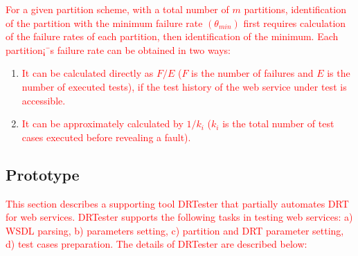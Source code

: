 \documentclass[10pt,journal,compsoc]{IEEEtran}
\begin{document}
\textcolor{red}{For a given partition scheme, with a total number of $m$ partitions, identification of the partition with the minimum failure rate $(\theta_{min})$ first requires calculation of the failure rates of each partition, then identification of the minimum. Each partition¡¯s failure rate can be obtained in two ways:}
\begin{enumerate}[1)]
  \item
  \textcolor{red}{It can be calculated directly as $F / E$ ($F$ is the number of failures and $E$ is the number of executed tests), if the test history of the web service under test is accessible.}

  \item
  \textcolor{red}{It can be approximately calculated by $1 / k_i$ ($k_i$ is the total number of test cases executed before revealing a fault).}
\end{enumerate}


\subsection{Prototype}
\label{sec:prototype}

\textcolor{red}{This section describes a supporting tool DRTester that partially automates DRT for web services. DRTester supports the following tasks in testing web services: a) WSDL parsing, b) parameters setting, c) partition and DRT parameter setting, d) test cases preparation. The details of DRTester are described below:}
\end{document}
